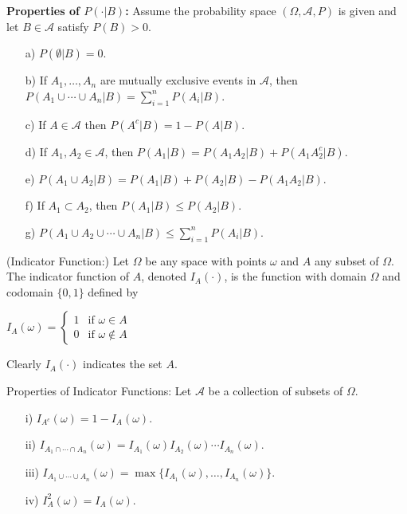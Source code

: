 \begin{Ejer} \textbf{Properties of $P(\cdot|B)$:} Assume the probability space $(\Omega,\mathcal{A},P)$ is given and let $B\in\mathcal{A}$ satisfy $P(B)>0$.

\begin{itemize}
\item[a) ] $P(\emptyset|B)=0.$

\item[b) ] If $A_1,\dots,A_n$ are mutually exclusive events in $\mathcal{A}$, then $P(A_1\cup\cdots\cup A_n|B)=\sum_{i=1}^{n}P(A_i|B).$

\item[c) ] If $A\in\mathcal{A}$ then $P(A^c|B)=1-P(A|B).$

\item[d) ] If $A_1,A_2\in\mathcal{A}$, then $P(A_1|B)=P(A_1A_2|B)+P(A_1A_2^c|B).$

\item[e) ] $P(A_1\cup A_2|B)=P(A_1|B)+P(A_2|B)-P(A_1A_2|B).$

\item[f) ] If $A_1\subset A_2$, then $P(A_1|B)\le P(A_2|B).$

\item[g) ]  $P(A_1\cup A_2\cup\cdots\cup A_n|B)\leq\sum_{i=1}^{n}P(A_i|B).$
\end{itemize}
\end{Ejer}

\begin{Def} (Indicator Function:) Let $\Omega$ be any space with points $\omega$ and $A$ any subset of $\Omega$.   The indicator function of $A$, denoted $I_A(\cdot)$, is the function with domain $\Omega$ and codomain $\{0,1\}$ defined by

$I_A(\omega)=
\begin{cases}
1 & \text{if } \omega\in A \\
0 & \text{if } \omega\notin A
\end{cases}
$

Clearly $I_A(\cdot)$ indicates the set $A$.
\end{Def}

\begin{Ejer} Properties of Indicator Functions: Let $\mathcal{A}$ be a collection of subsets of $\Omega$.

\begin{itemize}
\item[i) ] $I_{A^c}(\omega) = 1 - I_A(\omega)$.
\item[ii) ]  $I_{A_1 \cap \cdots \cap A_n}(\omega)= I_{A_1}(\omega) I_{A_2}(\omega)\cdots I_{A_n}(\omega).$

\item[iii) ] $I_{A_1 \cup \cdots \cup A_n}(\omega)= \max \{ I_{A_1}(\omega), \dots, I_{A_n}(\omega) \}.$

\item[iv) ] $I_A^2(\omega) = I_A(\omega).$
\end{itemize}
\end{Ejer}


